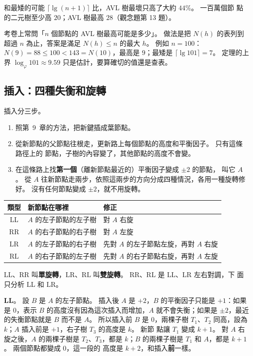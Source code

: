 和最矮的可能 $\lceil \lg(n+1) \rceil$ 比，AVL 樹最壞只高了大約 $44\%$。 一百萬個節
點的二元樹至少高 $20$；AVL 樹最高 $28$（觀念題第 13 題）。

考卷上常問「$n$ 個節點的 AVL 樹最高可能是多少」。 做法是把 $N(h)$ 的表列到超過 $n$
為止，答案是滿足 $N(h) \le n$ 的最大 $h$。 例如 $n = 100$：$N(9) = 88 \le 100 <
143 = N(10)$，最高是 $9$；最矮是 $\lceil \lg 101 \rceil = 7$。 定理的上界
$\log_\varphi 101 \approx 9.59$ 只是估計，要算確切的值還是查表。

\subsection{插入：四種失衡和旋轉}
\label{sec:bal-avl-insert}

插入分三步。

\begin{enumerate}
\item 照第~9~章的方法，把新鍵插成葉節點。
\item 從新節點的父節點往根走，更新路上每個節點的高度和平衡因子。 只有這條路徑上的
節點，子樹的內容變了，其他節點的高度不會變。
\item 在這條路上找\textbf{第一個}（離新節點最近的）平衡因子變成 $\pm 2$ 的節點，
叫它 $A$。 從 $A$ 往新節點走兩步，依照這兩步的方向分成四種情況，各用一種旋轉修
好。 沒有任何節點變成 $\pm 2$，就不用旋轉。
\end{enumerate}

\begin{center}
\begin{tabular}{cll}
\toprule
類型 & 新節點在哪裡 & 修正 \\
\midrule
LL & $A$ 的左子節點的左子樹 & 對 $A$ 右旋 \\
RR & $A$ 的右子節點的右子樹 & 對 $A$ 左旋 \\
LR & $A$ 的左子節點的右子樹 & 先對 $A$ 的左子節點左旋，再對 $A$ 右旋 \\
RL & $A$ 的右子節點的左子樹 & 先對 $A$ 的右子節點右旋，再對 $A$ 左旋 \\
\bottomrule
\end{tabular}
\end{center}

LL、RR 叫\textbf{單旋轉}，LR、RL 叫\textbf{雙旋轉}。 RR、RL 是 LL、LR 左右對調，下
面只分析 LL 和 LR。

\textbf{LL}。 設 $B$ 是 $A$ 的左子節點。 插入後 $A$ 是 $+2$，$B$ 的平衡因子只能是
$+1$：如果是 $0$，表示 $B$ 的高度沒有因為這次插入而增加，$A$ 就不會失衡；如果是
$\pm 2$，最近的失衡節點就是 $B$ 而不是 $A$。 所以插入前 $B$ 是 $0$，兩棵子樹
$T_1$、$T_2$ 同高，設為 $k$；$A$ 插入前是 $+1$，右子樹 $T_3$ 的高度是 $k$。 新節
點讓 $T_1$ 變成 $k + 1$。 對 $A$ 右旋之後，$A$ 的兩棵子樹是 $T_2$、$T_3$，都是
$k$；$B$ 的兩棵子樹是 $T_1$ 和 $A$，都是 $k + 1$。 兩個節點都變成 $0$，這一段的
高度是 $k + 2$，和插入\textbf{前}一樣。

